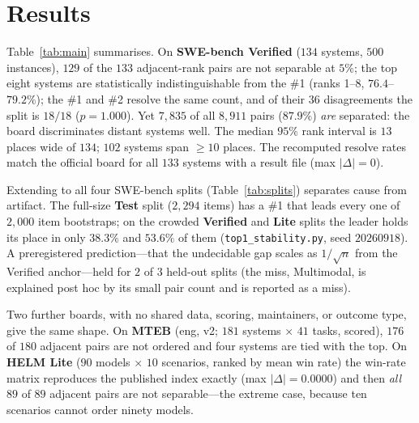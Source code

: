 \documentclass[11pt]{article}
\begin{document}
\section{Results}
\label{sec:results}
Table~\ref{tab:main} summarises. On \textbf{SWE-bench Verified} ($134$ systems, $500$ instances),
$129$ of the $133$ adjacent-rank pairs are not separable at $5\%$; the top eight systems are statistically
indistinguishable from the \#1 (ranks 1--8, $76.4$--$79.2\%$); the \#1 and \#2 resolve the same count,
and of their $36$ disagreements the split is $18/18$ ($p=1.000$). Yet $7{,}835$ of all $8{,}911$ pairs
($87.9\%$) \emph{are} separated: the board discriminates distant systems well. The median $95\%$ rank
interval is $13$ places wide of $134$; $102$ systems span $\ge 10$ places. The recomputed resolve
rates match the official board for all $133$ systems with a result file (max $|\Delta|=0$).

Extending to all four SWE-bench splits (Table~\ref{tab:splits}) separates cause from artifact. The
full-size \textbf{Test} split ($2{,}294$ items) has a \#1 that leads every one of $2{,}000$ item
bootstraps; on the crowded \textbf{Verified} and \textbf{Lite} splits the leader holds its place in
only $38.3\%$ and $53.6\%$ of them (\texttt{top1\_stability.py}, seed $20260918$). A preregistered prediction---that the undecidable gap scales as $1/\sqrt{n}$ from the Verified
anchor---held for $2$ of $3$ held-out splits (the miss, Multimodal, is explained post hoc by its
small pair count and is reported as a miss).

Two further boards, with no shared data, scoring, maintainers, or outcome type, give the same shape.
On \textbf{MTEB} (eng, v2; $181$ systems $\times$ $41$ tasks, scored), $176$ of $180$ adjacent pairs
are not ordered and four systems are tied with the top. On \textbf{HELM Lite} ($90$ models $\times$
$10$ scenarios, ranked by mean win rate) the win-rate matrix reproduces the published index exactly
(max $|\Delta| = 0.0000$) and then \emph{all} $89$ of $89$ adjacent pairs are not separable---the
extreme case, because ten scenarios cannot order ninety models.
\end{document}
